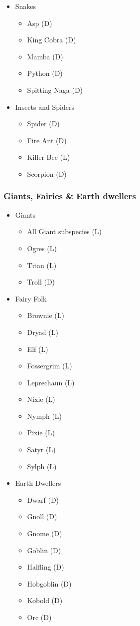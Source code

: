 \begin{multicols}{3}
\begin{itemize}
\item Snakes
\begin{itemize}
\item Asp (D)
\item King Cobra (D)
\item Mamba (D)
\item Python (D)
\item Spitting Naga (D)
\end{itemize}

\item Insects and Spiders
\begin{itemize}
\item Spider (D)
\item Fire Ant (D)
\item Killer Bee (L)
\item Scorpion (D)
\end{itemize}
\end{itemize}

\subsubsection{Giants, Fairies \& Earth dwellers}

\begin{itemize}
\item Giants
\begin{itemize}
\item All Giant subspecies (L)
\item Ogres (L)
\item Titan (L)
\item Troll (D)
\end{itemize}

\item Fairy Folk
\begin{itemize}
\item Brownie (L)
\item Dryad (L)
\item Elf (L)
\item Fossergrim (L)
\item Leprechaun (L)
\item Nixie (L)
\item Nymph (L)
\item Pixie (L)
\item Satyr (L)
\item Sylph (L)
\end{itemize}

\item Earth Dwellers
\begin{itemize}
\item Dwarf (D)
\item Gnoll (D)
\item Gnome (D)
\item Goblin (D)
\item Halfling (D)
\item Hobgoblin (D)
\item Kobold (D)
\item Orc (D)
\end{itemize}
\end{itemize}


\end{multicols}
